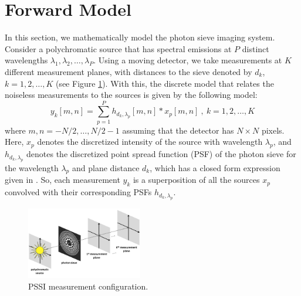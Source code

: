 \documentclass{article}
\begin{document}
\section{Forward Model}
\label{sec:format}
In this section, we mathematically model the photon sieve imaging system.
Consider a polychromatic source that has spectral emissions at $P$ distinct
wavelengths $\lambda_1, \lambda_2, \dots, \lambda_P$. Using a moving detector,
we take measurements at $K$ different measurement planes, with distances to the
sieve denoted by $d_k$, $k=1,2,\dots,K$ (see Figure \ref{fig:meas}). With this,
the discrete model that relates the noiseless measurements to the sources is
given by the following model:
\begin{equation}
y_k[m,n] = \sum_{p=1}^P h_{d_k,\lambda_p}[m,n] \ast x_p[m,n] \ , \ k = 1,2,\dots, K
\label{eq:fwd}
\end{equation}
where $m,n=-N/2, \dots, N/2-1$ assuming that the detector has $N\times N$
pixels. Here, $x_p$ denotes the discretized intensity of the source with
wavelength $\lambda_p$, and $h_{d_k,\lambda_p}$ denotes the discretized point
spread function (PSF) of the photon sieve for the wavelength $\lambda_p$ and
plane distance $d_k$, which has a closed form expression given in
\cite{oktem2013icip}. So, each measurement $y_k$ is a superposition of all the
sources $x_p$ convolved with their corresponding PSFs $h_{d_k,\lambda_p}$.

\begin{figure}[h]
\includegraphics[width=0.45\textwidth]{poster1}
\caption{PSSI measurement configuration.}
\label{fig:meas}
\end{figure}
\end{document}
